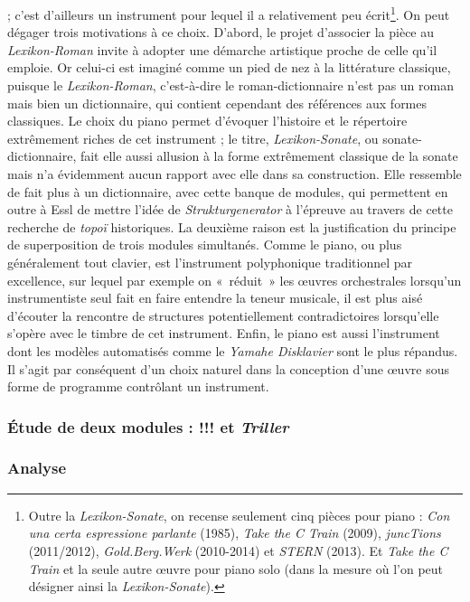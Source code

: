 \documentclass[a4paper,12pt]{article}
\newcommand{\guill}[1]{«~#1~»}
\begin{document}
; c'est d'ailleurs un instrument pour lequel il a relativement peu écrit\footnote{Outre la \emph{Lexikon-Sonate}, on recense seulement cinq pièces pour piano : \emph{Con una certa espressione parlante} (1985), \emph{Take the C Train} (2009), \emph{juncTions} (2011/2012), \emph{Gold.Berg.Werk} (2010-2014) et \emph{STERN} (2013). Et \emph{Take the C Train} et la seule autre œuvre pour piano solo (dans la mesure où l'on peut désigner ainsi la \emph{Lexikon-Sonate}).}. On peut dégager trois motivations à ce choix. D'abord, le projet d'associer la pièce au \emph{Lexikon-Roman} invite à adopter une démarche artistique proche de celle qu'il emploie. Or celui-ci est imaginé comme un pied de nez à la littérature classique, puisque le \emph{Lexikon-Roman}, c'est-à-dire le roman-dictionnaire n'est pas un roman mais bien un dictionnaire, qui contient cependant des références aux formes classiques. Le choix du piano permet d'évoquer l'histoire et le répertoire extrêmement riches de cet instrument ; le titre, \emph{Lexikon-Sonate}, ou sonate-dictionnaire, fait elle aussi allusion à la forme extrêmement classique de la sonate mais n'a évidemment aucun rapport avec elle dans sa construction. Elle ressemble de fait plus à un dictionnaire, avec cette banque de modules, qui permettent en outre à Essl de mettre l'idée de \emph{Strukturgenerator} à l'épreuve au travers de cette recherche de \emph{topoï} historiques. La deuxième raison est la justification du principe de superposition de trois modules simultanés. Comme le piano, ou plus généralement tout clavier, est l'instrument polyphonique traditionnel par excellence, sur lequel par exemple on \guill{réduit} les œuvres orchestrales lorsqu'un instrumentiste seul fait en faire entendre la teneur musicale, il est plus aisé d'écouter la rencontre de structures potentiellement contradictoires lorsqu'elle s'opère avec le timbre de cet instrument. Enfin, le piano est aussi l'instrument dont les modèles automatisés comme le \emph{Yamahe Disklavier} sont le plus répandus. Il s'agit par conséquent d'un choix naturel dans la conception d'une œuvre sous forme de programme contrôlant un instrument.

\subsubsection{Étude de deux modules : !!! et \emph{Triller}}

\subsubsection{Analyse}
\end{document}
